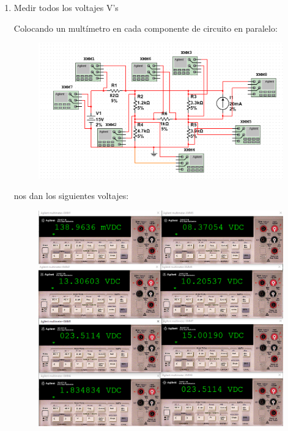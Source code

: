 \documentclass[12pt,a4paper]{article}
\begin{document}
\begin{enumerate}
\item Medir todos los voltajes V's

Colocando un multímetro en cada componente de circuito en paralelo:

\begin{figure}[h!]
    \centering
    \includegraphics[scale=0.4]{circuito voltajes.PNG}
    \label{fig:my_label}
\end{figure}

nos dan los siguientes voltajes:


\begin{figure}[h!]
    \centering
    \includegraphics[scale=0.4]{voltajes medidos.PNG}
    \label{fig:my_label}
\end{figure}




\end{enumerate}
\end{document}
